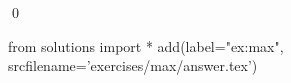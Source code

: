\begin{ex}
  \label{ex:max}
  
  \mbox{}\\ \\
  \qed
\end{ex}
\begin{python0}
from solutions import *
add(label="ex:max",
    srcfilename='exercises/max/answer.tex') 
\end{python0}                              
